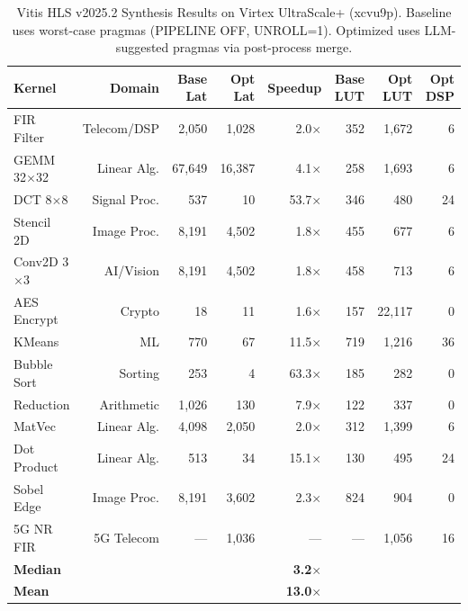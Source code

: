 
\begin{table}[t]
\centering
\caption{Vitis HLS v2025.2 Synthesis Results on Virtex UltraScale+ (xcvu9p).
Baseline uses worst-case pragmas (PIPELINE OFF, UNROLL=1).
Optimized uses LLM-suggested pragmas via post-process merge.}
\label{tab:vitis}
\begin{tabular}{lrrrrrrr}
\toprule
\textbf{Kernel} & \textbf{Domain} & \textbf{Base Lat} & \textbf{Opt Lat} & \textbf{Speedup} & \textbf{Base LUT} & \textbf{Opt LUT} & \textbf{Opt DSP} \\
\midrule
FIR Filter       & Telecom/DSP    & 2,050   & 1,028   & 2.0$\times$  & 352    & 1,672  & 6  \\
GEMM 32$\times$32 & Linear Alg.   & 67,649  & 16,387  & 4.1$\times$  & 258    & 1,693  & 6  \\
DCT 8$\times$8    & Signal Proc.  & 537     & 10      & 53.7$\times$ & 346    & 480    & 24 \\
Stencil 2D        & Image Proc.   & 8,191   & 4,502   & 1.8$\times$  & 455    & 677    & 6  \\
Conv2D 3$\times$3 & AI/Vision     & 8,191   & 4,502   & 1.8$\times$  & 458    & 713    & 6  \\
AES Encrypt       & Crypto        & 18      & 11      & 1.6$\times$  & 157    & 22,117 & 0  \\
KMeans            & ML            & 770     & 67      & 11.5$\times$ & 719    & 1,216  & 36 \\
Bubble Sort       & Sorting       & 253     & 4       & 63.3$\times$ & 185    & 282    & 0  \\
Reduction         & Arithmetic    & 1,026   & 130     & 7.9$\times$  & 122    & 337    & 0  \\
MatVec            & Linear Alg.   & 4,098   & 2,050   & 2.0$\times$  & 312    & 1,399  & 6  \\
Dot Product       & Linear Alg.   & 513     & 34      & 15.1$\times$ & 130    & 495    & 24 \\
Sobel Edge        & Image Proc.   & 8,191   & 3,602   & 2.3$\times$  & 824    & 904    & 0  \\
5G NR FIR         & 5G Telecom    & ---     & 1,036   & ---          & ---    & 1,056  & 16 \\
\midrule
\textbf{Median}   &               &         &         & \textbf{3.2$\times$} & & & \\
\textbf{Mean}     &               &         &         & \textbf{13.0$\times$} & & & \\
\bottomrule
\end{tabular}
\vspace{-2mm}
\end{table}

